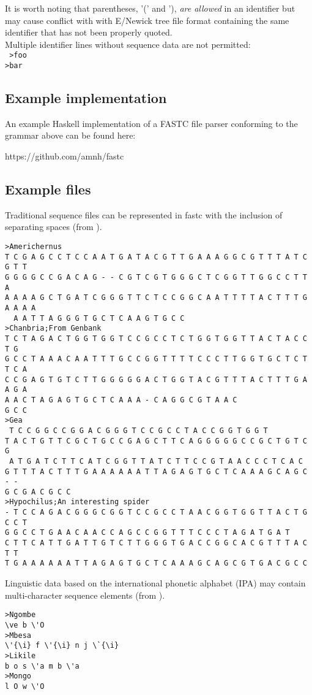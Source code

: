 \documentclass[12pt]{article}
\begin{document}
It is worth noting that parentheses, '(' and '), \textit{are allowed} in an identifier but may cause conflict with with E/Newick tree file format \citep{Cardonaetal2008} containing the same identifier that has not been properly quoted. \\

Multiple identifier lines without sequence data  are not permitted:\\
\texttt{	
>foo\\
>bar\\
}

\subsection{Example implementation}

An example Haskell implementation of a FASTC file parser conforming to the grammar above can be found here:

https://github.com/amnh/fastc


\subsection{Example files}
Traditional sequence files can be represented in fastc with the inclusion of separating spaces (from \citealp{Wheeler1998c}).
\singlespace
\begin{verbatim}
>Americhernus      
T C G A G C C T C C A A T G A T A C G T T G A A A G G C G T T T A T C G T T 
G G G G C C G A C A G - - C G T C G T G G G C T C G G T T G G C C T T A 
A A A A G C T G A T C G G G T T C T C C G G C A A T T T T A C T T T G A A A A
  A A T T A G G G T G C T C A A G T G C C 
>Chanbria;From Genbank
T C T A G A C T G G T G G T C C G C C T C T G G T G G T T A C T A C C T G 
G C C T A A A C A A T T T G C C G G T T T T C C C T T G G T G C T C T T C A 
C C G A G T G T C T T G G G G G A C T G G T A C G T T T A C T T T G A A G A 
A A C T A G A G T G C T C A A A - C A G G C G T A A C
G C C 
>Gea
 T C C G G C C G G A C G G G T C C G C C T A C C G G T G G T 
T A C T G T T C G C T G C C G A G C T T C A G G G G G C C G C T G T C G 
 A T G A T C T T C A T C G G T T A T C T T C C G T A A C C C T C A C 
G T T T A C T T T G A A A A A A T T A G A G T G C T C A A A G C A G C - -
G C G A C G C C 
>Hypochilus;An interesting spider
- T C C A G A C G G G C G G T C C G C C T A A C G G T G G T T A C T G C C T 
G G C C T G A A C A A C C A G C C G G T T T C C C T A G A T G A T 
C T T C A T T G A T T G T C T T G G G T G A C C G G C A C G T T T A C T T
T G A A A A A A T T A G A G T G C T C A A A G C A G C G T G A C G C C 
 \end{verbatim}
 \doublespace
Linguistic data based on the international phonetic alphabet (IPA) may contain multi-character sequence elements
(from \citealp{Whiteleyetal2019}).
\singlespace
\begin{verbatim}
>Ngombe
\ve b \'O
>Mbesa
\'{\i} f \'{\i} n j \`{\i}
>Likile
b o s \'a m b \'a
>Mongo
l O w \'O
\end{verbatim}
\end{document}

